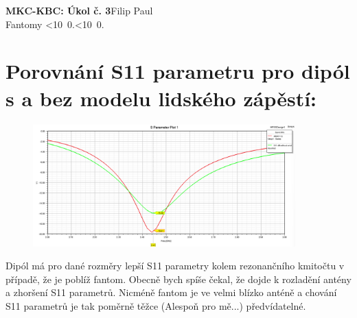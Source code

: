 \documentclass[10pt, a4paper]{article}%
\def\mydate{\leavevmode\hbox{\twodigits\day.\twodigits\month.\the\year}}
\def\twodigits#1{\ifnum#1<10 0\fi\the#1}
\begin{document}
\begin{flushleft}%
	\textbf{\Large{MKC-KBC: Úkol č. 3}}\hfill Filip Paul\\
	\large{Fantomy \hfill\mydate}
\end{flushleft}
	\section{\Large Porovnání S11 parametru pro dipól s a bez modelu lidského zápěstí:}
	\begin{figure}[ht!]
		\centering
		\includegraphics[width = 0.9\textwidth]{S11.png}
	\end{figure}
Dipól má pro dané rozměry lepší S11 parametry kolem rezonančního kmitočtu v případě, že je poblíž fantom.
Obecně bych spíše čekal, že dojde k rozladění antény a zhoršení S11 parametrů. Nicméně fantom je ve 
velmi blízko anténě a chování S11 parametrů je tak poměrně těžce (Alespoň pro mě...) předvídatelné. 
\end{document}

